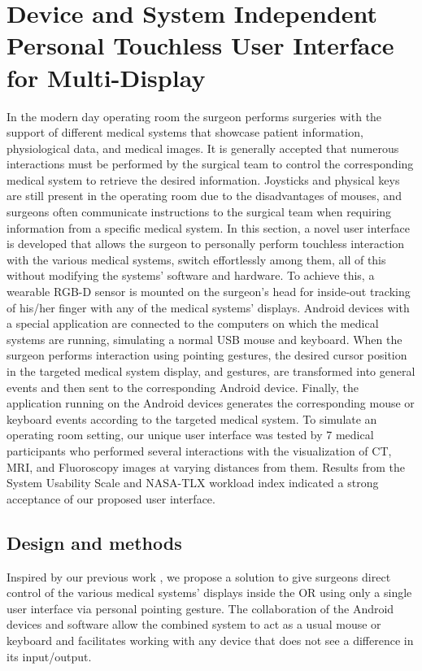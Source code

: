 %
\section{Device and System Independent Personal Touchless User Interface for Multi-Display}
\label{sec:4-IPCAI}
In the modern day operating room the surgeon performs surgeries with the support of different medical systems that showcase patient information, physiological data, and medical images. It is generally accepted that numerous interactions must be performed by the surgical team to control the corresponding medical system to retrieve the desired information. Joysticks and {physical} keys are still present in the operating room due to the disadvantages of mouses, and surgeons often communicate instructions to the surgical team when {requiring} information from a specific medical system. In this section, a novel user interface is developed that allows the surgeon to personally perform touchless interaction with the various medical systems, switch effortlessly among them, all of this without modifying the systems' software and hardware.
To achieve this, a wearable RGB-D sensor is mounted on the surgeon's head for inside-out tracking of {his/her} finger with any of the medical systems' displays. Android devices with a special application are connected to the computers on which the medical systems are running, simulating a normal USB mouse and keyboard. When the surgeon performs interaction using pointing gestures, the desired cursor position in the targeted medical system display, and gestures, are transformed into general events and then sent to the corresponding Android device. Finally, the application running on the Android devices generates the corresponding mouse or keyboard events according to the targeted medical system.
To simulate an operating room setting, our unique user interface was tested by 7 medical participants who performed several interactions with {the visualization of CT, MRI, and Fluoroscopy images} at varying distances from them. Results from the System Usability Scale and NASA-TLX workload index indicated a strong acceptance of our proposed user interface.

\subsection{Design and methods} \label{sec:IPCAI:Methods}
Inspired by our previous work \cite{ma2015ismar}, we propose a solution to give surgeons direct control of the various medical systems' displays inside the OR using only a single user interface via personal pointing gesture. The collaboration of the Android devices and software allow the combined system to act as a usual mouse or keyboard and facilitates working with any device that does not see a difference in its input/output.
